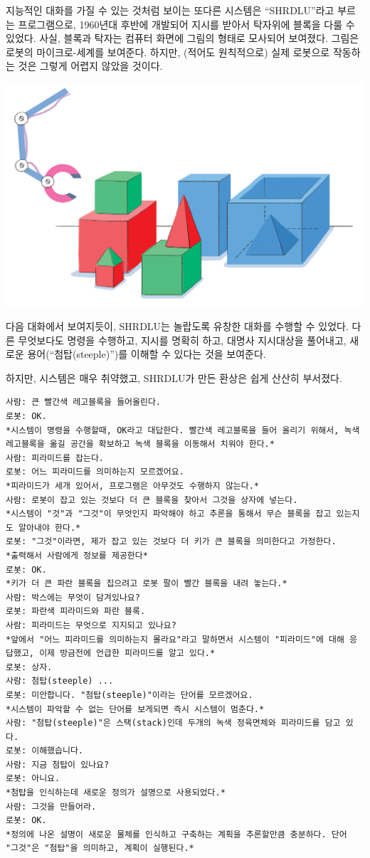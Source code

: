 \documentclass[]{article}
\begin{document}
지능적인 대화를 가질 수 있는 것처럼 보이는 또다른 시스템은
``SHRDLU''라고 부르는 프로그램으로, 1960년대 후반에 개발되어 지시를
받아서 탁자위에 블록을 다룰 수 있었다. 사실, 블록과 탁자는 컴퓨터 화면에
그림의 형태로 모사되어 보여졌다. 그림은 로봇의 마이크로-세계를 보여준다.
하지만, (적어도 원칙적으로) 실제 로봇으로 작동하는 것은 그렇게 어렵지
않았을 것이다.

\includegraphics{csunplugged/06-part/img/ch21-turing/20-turing-02-robot.png}

다음 대화에서 보여지듯이, SHRDLU는 놀랍도록 유창한 대화를 수행할 수
있었다. 다른 무엇보다도 명령을 수행하고, 지시를 명확히 하고, 대명사
지시대상을 풀어내고, 새로운 용어(``첨탑(steeple)'')를 이해할 수 있다는
것을 보여준다.

하지만, 시스템은 매우 취약했고, SHRDLU가 만든 환상은 쉽게 산산히
부서졌다.

\begin{verbatim}
사람: 큰 빨간색 레고블록을 들어올린다.
로봇: OK.
*시스템이 명령을 수행할때, OK라고 대답한다. 빨간색 레고블록을 들어 올리기 위해서, 녹색 레고블록을 옮길 공간을 확보하고 녹색 블록을 이동해서 치워야 한다.*
사람: 피라미드를 잡는다.
로봇: 어느 피라미드를 의미하는지 모르겠어요.
*피라미드가 세개 있어서, 프로그램은 아무것도 수행하지 않는다.*
사람: 로봇이 잡고 있는 것보다 더 큰 블록을 찾아서 그것을 상자에 넣는다.
*시스템이 "것"과 "그것"이 무엇인지 파악해야 하고 추론을 통해서 무슨 블록을 잡고 있는지도 알아내야 한다.*
로봇: "그것"이라면, 제가 잡고 있는 것보다 더 키가 큰 블록을 의미한다고 가정한다.
*출력해서 사람에게 정보를 제공한다*
로봇: OK.
*키가 더 큰 파란 블록을 집으려고 로봇 팔이 빨간 블록을 내려 놓는다.*
사람: 박스에는 무엇이 담겨있나요?
로봇: 파란색 피라미드와 파란 블록.
사람: 피라미드는 무엇으로 지지되고 있나요?
*앞에서 "어느 피라미드를 의미하는지 몰라요"라고 말하면서 시스템이 "피라미드"에 대해 응답했고, 이제 방금전에 언급한 피라미드를 알고 있다.*
로봇: 상자.
사람: 첨탑(steeple) ...
로봇: 미안합니다. "첨탑(steeple)"이라는 단어를 모르겠어요.
*시스템이 파악할 수 없는 단어를 보게되면 즉시 시스템이 멈춘다.*
사람: "첨탑(steeple)"은 스택(stack)인데 두개의 녹색 정육면체와 피라미드를 담고 있다.
로봇: 이해했습니다.
사람: 지금 첨탑이 있나요?
로봇: 아니요.
*첨탑을 인식하는데 새로운 정의가 설명으로 사용되었다.*
사람: 그것을 만들어라.
로봇: OK.
*정의에 나온 설명이 새로운 물체를 인식하고 구축하는 계획을 추론할만큼 충분하다. 단어 "그것"은 "첨탑"을 의미하고, 계획이 실행된다.*
\end{verbatim}
\end{document}
